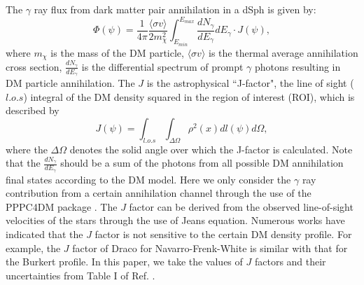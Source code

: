 \documentclass[12pt,prd,showpacs,amsmath,amssymb,aps,floats,floatfix,nofootinbib]{revtex4-1}
\begin{document}
The $\gamma$ ray flux from dark matter pair annihilation in a dSph is given by:
\begin{equation}\label{flux}
\Phi(\psi)=
\frac{1}{4\pi}\frac{\langle\sigma v\rangle}{2m_{\chi}^{2}}\int^{E_{max}}_{E_{min}}\frac{dN_{\gamma}}{dE_{\gamma}}dE_{\gamma}\cdot J(\psi),
\end{equation}
where $m_{\chi}$ is the mass of the DM particle, $\langle\sigma v\rangle$ is the thermal average annihilation cross section, $\frac{dN_{\gamma}}{dE_{\gamma}}$ is the differential spectrum of prompt $\gamma$ photons resulting in DM particle annihilation. The $J$ is the astrophysical ``J-factor", the line of sight ($l.o.s$) integral of the DM density squared in the region of interest (ROI), which is described by
\begin{equation}\label{jfactor}
J(\psi)=\int_{l.o.s}\int_{\Delta\Omega}\rho^{2}(x)dl(\psi)d\Omega,
\end{equation}
where the $\Delta\Omega$ denotes the solid angle over which the J-factor is calculated. Note that the $\frac{dN_{\gamma}}{dE_{\gamma}}$ should be a sum of the photons from all possible DM annihilation final states according to the DM model. Here we only consider the $\gamma$ ray contribution from a certain annihilation channel through the use of the PPPC4DM package \cite{Cirelli:2010xx,Ciafaloni:2010ti}. The $J$ factor can be derived from the observed line-of-sight velocities of the stars through the use of Jeans equation.
Numerous works have indicated that the $J$ factor is not sensitive to the certain DM density profile. For example, the $J$ factor of Draco for Navarro-Frenk-White is similar with that for the Burkert profile.
In this paper, we take the values of $J$ factors and their uncertainties from Table I of Ref. \cite{Fermi-LAT:2016uux}.
\end{document}

